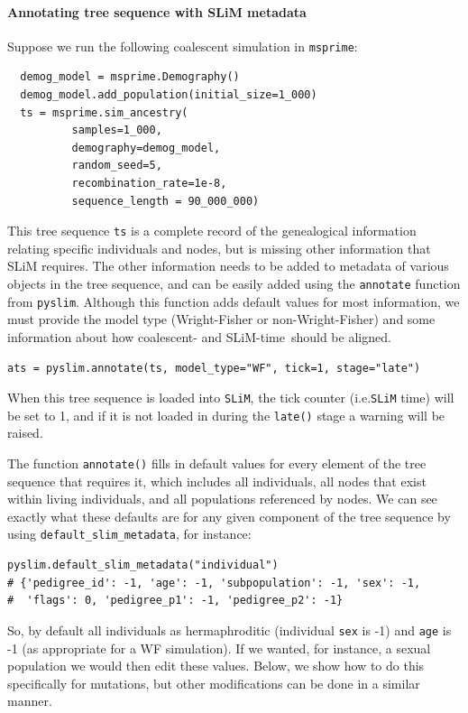 \documentclass[12pt]{article}
\newcommand{\msprime}[0]{\texttt{msprime}\xspace}
\newcommand{\slim}[0]{\texttt{SLiM}\xspace}
\newcommand{\pyslim}[0]{\texttt{pyslim}\xspace}
\newcommand*{\ie}{i.e.\xcomma}
\begin{document}
\paragraph*{Annotating tree sequence with SLiM metadata}
Suppose we run the following coalescent simulation in \msprime:
\begin{verbatim}
  demog_model = msprime.Demography()
  demog_model.add_population(initial_size=1_000)
  ts = msprime.sim_ancestry(
          samples=1_000,
          demography=demog_model,
          random_seed=5,
          recombination_rate=1e-8,
          sequence_length = 90_000_000)
\end{verbatim}
This tree sequence \verb|ts| is a complete record of the genealogical information relating specific individuals
and nodes, but is missing other information that  SLiM requires.
The other information needs to be added to metadata of various objects in the tree sequence,
and can be easily added using the \verb|annotate| function from \pyslim.
Although this function adds default values for most information,
we must provide the model type (Wright-Fisher or non-Wright-Fisher)
and some information about how coalescent- and SLiM-time\ should be aligned.
\begin{verbatim}
ats = pyslim.annotate(ts, model_type="WF", tick=1, stage="late")
\end{verbatim}
When this tree sequence is loaded into \slim, the tick counter (\ie \slim time)
will be set to 1, and if it is not loaded in during the \verb|late()| stage a warning will be raised.

The function \verb|annotate()| fills in default values for every element of the tree sequence that requires it,
which includes all individuals, all nodes that exist within living individuals, and all
populations referenced by nodes. We can see exactly what these defaults
are for any given component of the tree sequence by using \verb|default_slim_metadata|,
for instance:
\begin{verbatim}
pyslim.default_slim_metadata("individual")
# {'pedigree_id': -1, 'age': -1, 'subpopulation': -1, 'sex': -1,
#  'flags': 0, 'pedigree_p1': -1, 'pedigree_p2': -1}
\end{verbatim}
So, by default all individuals as hermaphroditic (individual \verb|sex| is -1)
and \verb|age| is -1 (as appropriate for a WF simulation).
If we wanted, for instance, a sexual population we would then edit these values.
Below, we show how to do this specifically for mutations, but other modifications
can be done in a similar manner.
\end{document}
